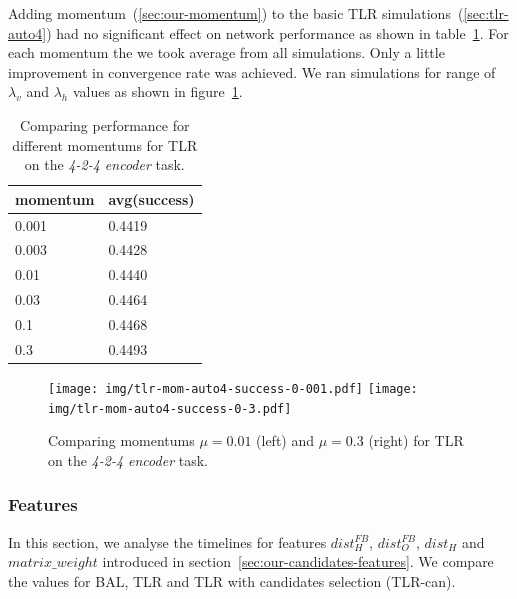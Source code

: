 Adding momentum~(\ref{sec:our-momentum}) to the basic TLR simulations~(\ref{sec:tlr-auto4}) had no significant effect on network performance as shown in table~\ref{tab:results-mom-auto4}. For each momentum the we took average from all simulations. Only a little improvement in convergence rate was achieved. We ran simulations for range of $\lambda_v$ and $\lambda_h$ values as shown in figure~\ref{fig:results-tlr-auto4-momentum}. 
\begin{table}[H] 
  \centering
  {\small
    \begin{tabular}{|l|l|}
    \hline
momentum & avg(success) \\
    \hline
0.001  & 0.4419 \\
    \hline
0.003  & 0.4428 \\
    \hline
0.01   & 0.4440 \\
    \hline
0.03   & 0.4464 \\
    \hline
0.1    & 0.4468 \\
    \hline
0.3    & 0.4493 \\
    \hline
    \end{tabular}
  }
  \caption{Comparing performance for different momentums for TLR on the \emph{4-2-4 encoder} task.} 
  \label{tab:results-mom-auto4}
\end{table}


\begin{figure}[H]
  \centering
  \texttt{[image: img/tlr-mom-auto4-success-0-001.pdf]}  
  \texttt{[image: img/tlr-mom-auto4-success-0-3.pdf]}  
   \caption{Comparing momentums $\mu=0.01$ (left) and $\mu=0.3$ (right) for TLR on the \emph{4-2-4 encoder} task.}
  \label{fig:results-tlr-auto4-momentum}
\end{figure}


\subsubsection{Features}
In this section, we analyse the timelines for features $dist_{H}^{FB}$, $dist_{O}^{FB}$, $dist_{H}$ and $matrix\_weight$ introduced in section~\ref{sec:our-candidates-features}. We compare the values for BAL, TLR and TLR with candidates selection (TLR-can). 

